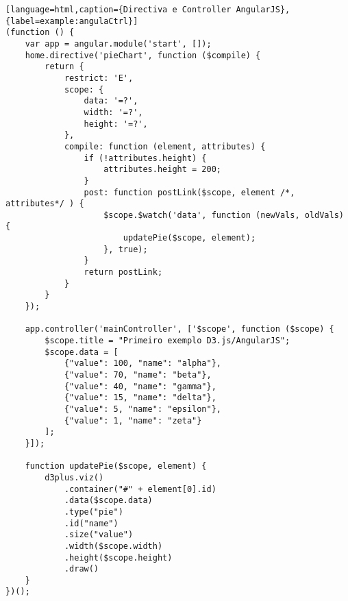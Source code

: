 \begin{lstlisting}[language=html,caption={Directiva e Controller AngularJS},{label=example:angulaCtrl}]
(function () {
    var app = angular.module('start', []);
    home.directive('pieChart', function ($compile) {
        return {
            restrict: 'E',
            scope: {
                data: '=?',
                width: '=?',
                height: '=?',
            },
            compile: function (element, attributes) {
                if (!attributes.height) {
                    attributes.height = 200;
                }
                post: function postLink($scope, element /*, attributes*/ ) {
                    $scope.$watch('data', function (newVals, oldVals) {
                        updatePie($scope, element);
                    }, true);
                }
                return postLink;
            }
        }
    });

    app.controller('mainController', ['$scope', function ($scope) {
        $scope.title = "Primeiro exemplo D3.js/AngularJS";
        $scope.data = [
            {"value": 100, "name": "alpha"},
            {"value": 70, "name": "beta"},
            {"value": 40, "name": "gamma"},
            {"value": 15, "name": "delta"},
            {"value": 5, "name": "epsilon"},
            {"value": 1, "name": "zeta"}
        ];
    }]);

    function updatePie($scope, element) {
        d3plus.viz()
            .container("#" + element[0].id)
            .data($scope.data)
            .type("pie")
            .id("name")
            .size("value")
            .width($scope.width)
            .height($scope.height)
            .draw()
    }
})();
\end{lstlisting}


